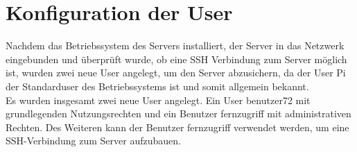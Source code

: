 \documentclass[a4paper, 11pt]{scrartcl}
\begin{document}
\section{Konfiguration der User}\label{ch:user}
Nachdem das Betriebssystem des Servers installiert, der Server in das Netzwerk eingebunden und überprüft wurde, ob eine SSH Verbindung zum Server möglich ist, wurden zwei neue User angelegt, um den Server
abzusichern, da der User \glqq Pi\grqq{} der Standarduser des Betriebssystems ist und somit allgemein bekannt.
\\
Es wurden insgesamt zwei neue User angelegt. Ein User \glqq benutzer72\grqq{} mit grundlegenden Nutzungsrechten und ein Benutzer \glqq fernzugriff\grqq{} mit administrativen Rechten. Des Weiteren kann der
Benutzer \glqq fernzugriff\grqq{} verwendet werden, um eine SSH-Verbindung zum Server aufzubauen.
\end{document}

